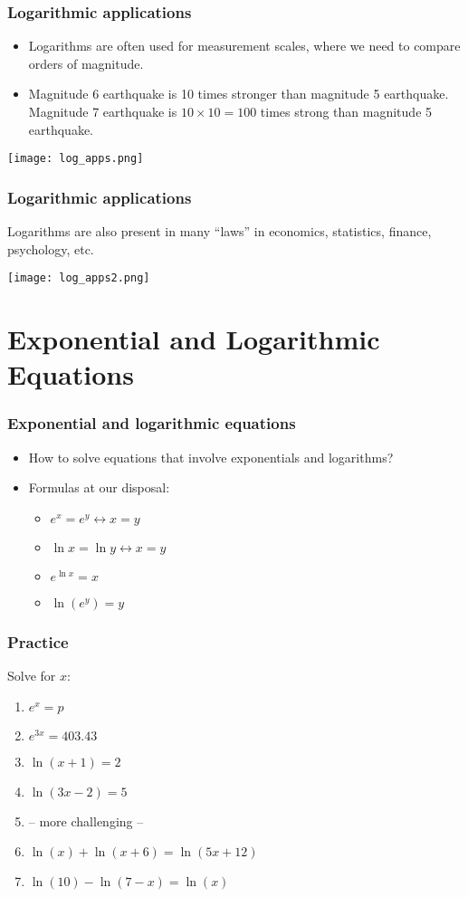 \documentclass[xcolor=dvipsnames]{beamer} %
\begin{document}
\begin{frame}
\frametitle{Logarithmic applications}
\begin{scriptsize}
\begin{itemize}
\item Logarithms are often used for measurement scales, where we need to compare orders of magnitude. 
\item Magnitude 6 earthquake is 10 times stronger than magnitude 5 earthquake. Magnitude 7 earthquake is $10\times 10=100$ times strong than magnitude 5 earthquake.
\end{itemize}
\end{scriptsize}
\begin{center}
\texttt{[image: log\_apps.png]}
\end{center}
\end{frame}

\begin{frame}
\frametitle{Logarithmic applications}
Logarithms are also present in many ``laws'' in economics, statistics, finance, psychology, etc. 
\begin{center}
\texttt{[image: log\_apps2.png]}
\end{center}
\end{frame}


\section{Exponential and Logarithmic Equations}

\begin{frame}
\frametitle{Exponential and logarithmic equations }
\begin{itemize}
    \setlength\itemsep{1em}
\item How to solve equations that involve exponentials and logarithms? 
\item Formulas at our disposal:
    \begin{itemize}
        \setlength\itemsep{1em}
        \item[] $e^x = e^y \leftrightarrow x = y$
        \item[] $\ln x = \ln y \leftrightarrow x = y$ 
        \item[] $e^{\ln x} = x$
        \item[] $\ln (e^y) = y$
    \end{itemize}
\end{itemize}
\end{frame}

\begin{frame}
\frametitle{Practice}
Solve for $x$:
\begin{enumerate}
\item $e^x = p$
\item $e^{3x} = 403.43$
\item $\ln (x + 1) = 2$
\item $\ln (3x-2) = 5$
\item[] -- more challenging -- 
\item $\ln(x) + \ln(x+6) = \ln(5x+12)$
\item $\ln (10) - \ln (7-x) = \ln (x)$
\end{enumerate}
\end{frame}
\end{document}
